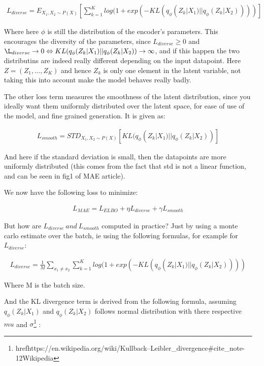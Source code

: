 \documentclass{article} %
\begin{document}
\begin{align}\label{loss1}
  L_{diverse} = E_{X_1, X_2 \sim P(X)}[\sum\limits_{k=1}^Klog(1 + exp(-KL(q_\phi(Z_k|X_1)||q_{\phi}(Z_k|X_2))))]
\end{align}

Where here $\phi$ is still the distribution of the encoder's parameters. This
encourages the diversity of the parameters, since $L_{diverse} \geq 0$ and
$\L_{diverse} \rightarrow 0 \Leftrightarrow
KL(q_\phi(Z_k|X_1)||q_{\phi}(Z_k|X_2)) \rightarrow \infty$, and if this happen
the two distributins are indeed really different depending on the input
datapoint. Here $Z = (Z_1,...,Z_K)$ and hence $Z_k$ is only one element in the
latent variable, not taking this into account make the model behaves really
badly.

The other loss term measures the smoothness of the latent distribution, since
you ideally want them uniformly distributed over the latent space, for ease of
use of the model, and fine grained generation. It is given as:

\begin{align}\label{loss1}
  L_{smooth} = STD_{X_1, X_2 \sim P(X)}[KL(q_\phi(Z_k|X_1)||q_{\phi}(Z_k|X_2))]
\end{align}

And here if the standard deviation is small, then the datapoints are more
uniformly distributed (this comes from the fact that std is not a linear
function, and can be seen in fig1 of MAE article).

We now have the following loss to minimize:

\begin{align}\label{loss1}
  L_{MAE} = L_{ELBO} + \eta L_{diverse} + \gamma L_{smooth}
\end{align}

But how are $L_{diverse}\ and\ L_{smooth}$ computed in practice? Just by using a
monte carlo estimate over the batch, ie using the following formulas, for
example for $L_{diverse}$:

\begin{align}\label{loss1}
  L_{diverse} = \frac{1}{M}\sum\limits_{x_1 \neq x_2}\sum\limits_{k=1}^Klog(1 + exp(-KL(q_\phi(Z_k|X_1)||q_{\phi}(Z_k|X_2))))
\end{align}

Where M is the batch size.

And the KL divergence term is derived from the following formula, assuming
$q_\phi(Z_k|X_1)$ and $q_{\phi}(Z_k|X_2)$ follows normal distribution with there
respective $mu$ and $\sigma$\footnote{href{https://en.wikipedia.org/wiki/Kullback–Leibler\_divergence\#cite\_note-12}{Wikipedia}} :
\end{document}

